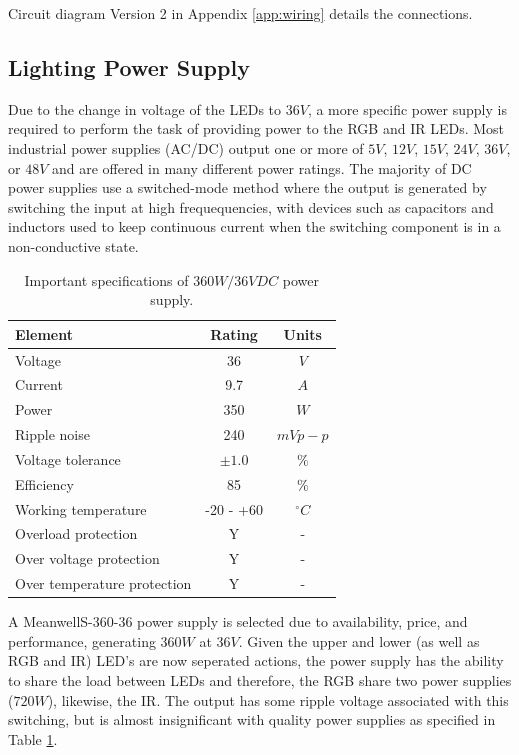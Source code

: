 \documentclass[fleqn,twoside,12pt]{report}
\begin{document}
Circuit diagram Version 2 in Appendix \ref{app:wiring} details the connections.


\subsection{Lighting Power Supply}

Due to the change in voltage of the LEDs to $36V$, a more specific power supply is required to perform the task of providing power to the RGB and IR LEDs. Most industrial power supplies (AC/DC) output one or more of $5V$, $12V$, $15V$, $24V$, $36V$, or $48V$ and are offered in many different power ratings. The majority of DC power supplies use a switched-mode method where the output is generated by switching the input at high frequequencies, with devices such as capacitors and inductors used to keep continuous current when the switching component is in a non-conductive state. 

\begin{table}[h]
	\centering
	\caption{Important specifications of $360W/36VDC$ power supply.}
	\label{tab:meanwell_specs}
	\begin{tabular}{lcc}
		\toprule
		\textbf{Element}  & \textbf{Rating} & \textbf{Units} \\[8pt]
		\midrule
		Voltage 					& 36 & $V$ \\[4pt]
		Current 					& 9.7 & $A$ \\[4pt]
		Power 						& 350 & $W$  \\[4pt]
		Ripple noise 				& 240 & $mVp-p$  \\[4pt]
		Voltage tolerance 			& $\pm1.0$ & $\%$  \\[4pt]
		Efficiency 					& 85 & $\%$ \\[4pt]
		Working temperature 		& -20 - +60 & $^{\circ}C$ \\[4pt]
		Overload protection 		& Y & - \\[4pt]
		Over voltage protection 	& Y & - \\[4pt]
		Over temperature protection & Y & - \\[4pt]
		\bottomrule
	\end{tabular}
\end{table}

A Meanwell\texttrademark S-360-36 power supply is selected due to availability, price, and performance, generating $360W$ at $36V$. Given the upper and lower (as well as RGB and IR) LED's are now seperated actions, the power supply has the ability to share the load between LEDs and therefore, the RGB share two power supplies ($720W$), likewise, the IR. The output has some ripple voltage associated with this switching, but is almost insignificant with quality power supplies as specified in Table \ref{tab:meanwell_specs}.
\end{document}
